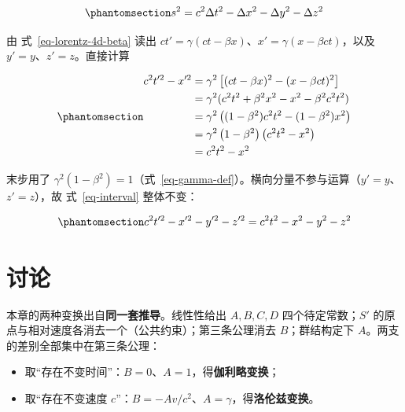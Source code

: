 \documentclass[
  chinese,
  a4paper,
  UTF8,
  12pt,
  oneside,
  openany]{ctexbook}
\providecommand{\tightlist}{%
  \setlength{\itemsep}{0pt}\setlength{\parskip}{0pt}}
\theoremstyle{plain}
\theoremstyle{plain}
\theoremstyle{plain}
\theoremstyle{definition}
\theoremstyle{plain}
\theoremstyle{plain}
\theoremstyle{remark}
\begin{document}
\begin{equation}\protect\phantomsection\label{eq-interval}{
s^{2} = c^{2}\Delta t^{2} - \Delta x^{2} - \Delta y^{2} - \Delta z^{2}
}\end{equation}

由 式~\ref{eq-lorentz-4d-beta} 读出
\(ct' = \gamma(ct - \beta x)\)、\(x' = \gamma(x - \beta ct)\)，以及
\(y' = y\)、\(z' = z\)。直接计算

\begin{equation}\protect\phantomsection\label{eq-interval-verify}{
\begin{aligned}
c^{2}t'^{2} - x'^{2}
&= \gamma^{2}\left[(ct - \beta x)^{2} - (x - \beta ct)^{2}\right] \\
&= \gamma^{2}(c^{2}t^{2} + \beta^{2}x^{2} - x^{2} - \beta^{2}c^{2}t^{2}) \\
&= \gamma^{2}\left((1 - \beta^{2})c^{2}t^{2} - (1 - \beta^{2}) x^{2}\right)\\
&= \gamma^{2}\left(1 - \beta^{2}\right)\left(c^{2}t^{2} - x^{2}\right) \\
&= c^{2}t^{2} - x^{2}
\end{aligned}
}\end{equation}

末步用了
\(\gamma^{2}\left(1 - \beta^{2}\right) = 1\)（式~\ref{eq-gamma-def}）。横向分量不参与运算（\(y' = y\)、\(z' = z\)），故
式~\ref{eq-interval} 整体不变：

\begin{equation}\protect\phantomsection\label{eq-interval-invariance}{
c^{2}t'^{2} - x'^{2} - y'^{2} - z'^{2}
=
c^{2}t^{2} - x^{2} - y^{2} - z^{2}
}\end{equation}

\section{讨论}\label{ux8ba8ux8bba}

本章的两种变换出自\textbf{同一套推导}。线性性给出 \(A, B, C, D\)
四个待定常数；\(S'\)
的原点与相对速度各消去一个（公共约束）；第三条公理消去 \(B\)；群结构定下
\(A\)。两支的差别全部集中在第三条公理：

\begin{itemize}
\tightlist
\item
  取``存在不变时间''：\(B = 0\)、\(A = 1\)，得\textbf{伽利略变换}；
\item
  取``存在不变速度
  \(c\)''：\(B = -Av/c^{2}\)、\(A = \gamma\)，得\textbf{洛伦兹变换}。
\end{itemize}
\end{document}
